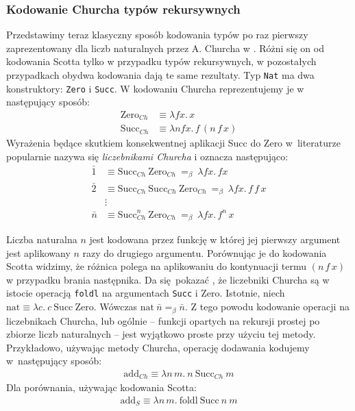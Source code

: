 \subsubsection{Kodowanie Churcha typów rekursywnych}
Przedstawimy teraz klasyczny sposób kodowania typów po raz pierwszy zaprezentowany dla liczb naturalnych przez A. Churcha w \cite{Church1941-CHUTCO-7}. Różni się on od kodowania Scotta tylko w przypadku typów rekursywnych, w pozostałych przypadkach obydwa kodowania dają te same rezultaty. Typ \texttt{Nat} ma dwa konstruktory: \texttt{Zero} i \texttt{Succ}. W kodowaniu Churcha reprezentujemy je w następujący sposób:
\begin{align*}
  \mathrm{Zero}_{Ch} &\equiv \lambda f x.\,x\\
  \mathrm{Succ}_{Ch} &\equiv \lambda n f x.\,f\,(n\,f\,x)
\end{align*}
Wyrażenia będące skutkiem konsekwentnej aplikacji Succ do Zero w~literaturze popularnie nazywa się \emph{liczebnikami Churcha} i oznacza następująco:
\begin{align*}
  \bar{1} &\equiv \mathrm{Succ}_{Ch}\ \mathrm{Zero}_{Ch} \ =_\beta\ \lambda f x.\, fx\\
  \bar{2} &\equiv \mathrm{Succ}_{Ch}\ \mathrm{Succ}_{Ch}\ \mathrm{Zero}_{Ch}\ =_\beta\ \lambda f x.\, f\,f\,x\\
    &\vdots \\
  \bar{n} &\equiv \mathrm{Succ}_{Ch}^n\ \mathrm{Zero}_{Ch}\  =_\beta\  \lambda f x.\, f^n\,x
\end{align*}

Liczba naturalna \(n\) jest kodowana przez funkcję w której jej pierwszy argument jest aplikowany \(n\) razy do drugiego argumentu.
Porównując je do kodowania Scotta widzimy, że różnica polega na aplikowaniu do kontynuacji termu \((n\,f\,x)\) w przypadku brania następnika. Da się pokazać \cite{hinze_2005}, że liczebniki Churcha są w istocie operacją \texttt{foldl} na argumentach \texttt{Succ} i {Zero}. Istotnie, niech \(\mathrm{nat} \equiv \lambda c.\ c\ \mathrm{Succ}\ \mathrm{Zero}\). Wówczas \(\mathrm{nat}\ \bar{n} =_\beta \bar{n}\). Z tego powodu kodowanie operacji na liczebnikach Churcha, lub ogólnie – funkcji opartych na rekursji prostej po zbiorze liczb naturalnych – jest wyjątkowo proste przy użyciu tej metody. Przykładowo, używając metody Churcha, operację dodawania kodujemy w~następujący sposób:
\begin{align*}
  \mathrm{add}_{Ch} \equiv \lambda n\, m.\ n\ \mathrm{Succ}_{Ch}\ m
\end{align*}
Dla porównania, używając kodowania Scotta:
\begin{align*}
  \mathrm{add}_{S} \equiv \lambda n\,m.\ \mathrm{foldl}\ \mathrm{Succ}\ n\ m
\end{align*}

